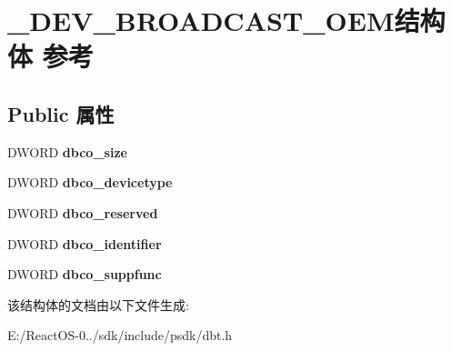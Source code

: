 \hypertarget{struct___d_e_v___b_r_o_a_d_c_a_s_t___o_e_m}{}\section{\+\_\+\+D\+E\+V\+\_\+\+B\+R\+O\+A\+D\+C\+A\+S\+T\+\_\+\+O\+E\+M结构体 参考}
\label{struct___d_e_v___b_r_o_a_d_c_a_s_t___o_e_m}
\subsection*{Public 属性}
\begin{DoxyCompactItemize}
\item 
\mbox{\label{struct___d_e_v___b_r_o_a_d_c_a_s_t___o_e_m_a11e4cd96df54fe18974a6894e1859613}} 
D\+W\+O\+RD {\bfseries dbco\+\_\+size}
\item 
\mbox{\label{struct___d_e_v___b_r_o_a_d_c_a_s_t___o_e_m_af02b5e2f180b44fd6b5bb6741debb343}} 
D\+W\+O\+RD {\bfseries dbco\+\_\+devicetype}
\item 
\mbox{\label{struct___d_e_v___b_r_o_a_d_c_a_s_t___o_e_m_af8808c9753c9c97a8c3d53d18e3b39ea}} 
D\+W\+O\+RD {\bfseries dbco\+\_\+reserved}
\item 
\mbox{\label{struct___d_e_v___b_r_o_a_d_c_a_s_t___o_e_m_a6ac8cbea74393eb59e4fba8e84f05430}} 
D\+W\+O\+RD {\bfseries dbco\+\_\+identifier}
\item 
\mbox{\label{struct___d_e_v___b_r_o_a_d_c_a_s_t___o_e_m_a290bb398b29d114158c32fb3799fa14a}} 
D\+W\+O\+RD {\bfseries dbco\+\_\+suppfunc}
\end{DoxyCompactItemize}


该结构体的文档由以下文件生成\+:\begin{DoxyCompactItemize}
\item 
E\+:/\+React\+O\+S-\/0../sdk/include/psdk/dbt.\+h\end{DoxyCompactItemize}
